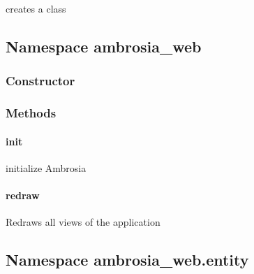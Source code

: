 \documentclass[letterpaper,10pt,english]{sphinxmanual}
\begin{document}
creates a class


\subsection{Namespace ambrosia\_web}
\label{ambrosia_web::doc}\label{ambrosia_web:namespace-ambrosia-web}

\subsubsection{Constructor}
\label{ambrosia_web:constructor}

\begin{fulllineitems}
\label{ambrosia_web:ambrosia_web}
\end{fulllineitems}



\subsubsection{Methods}
\label{ambrosia_web:methods}

\paragraph{init}
\label{ambrosia_web:init}

\begin{fulllineitems}
\label{ambrosia_web:ambrosia_web.init}
\end{fulllineitems}


initialize Ambrosia


\paragraph{redraw}
\label{ambrosia_web:redraw}

\begin{fulllineitems}
\label{ambrosia_web:ambrosia_web.redraw}
\end{fulllineitems}


Redraws all views of the application


\subsection{Namespace ambrosia\_web.entity}
\label{ambrosia_web.entity::doc}\label{ambrosia_web.entity:namespace-ambrosia-web-entity}
\end{document}
